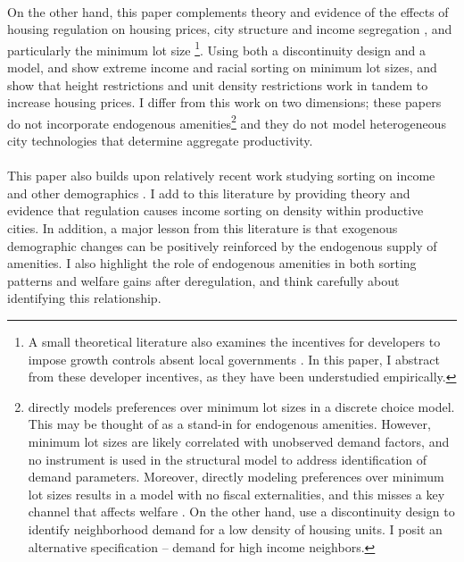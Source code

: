 \documentclass[12pt]{article}
\begin{document}
	\paragraph*{}
	On the other hand, this paper complements theory and evidence of the effects of housing regulation on housing prices, city structure and income segregation \citep{MolloyRSUE, gyourkomolloy, turner2014, glaesergyourko2018, bruecknersingh, anagoletal2021, bbheight, mills2005, HILBER2013, op2014}, and particularly the minimum lot size \citep{zabel, Song, kulka, Cui, molloynathansonpaciorek, KSC, griesonwhite, WHITE1975}\footnote{A small theoretical literature also examines the incentives for developers to impose growth controls absent local governments \citep{helseystrangeGrowthControls, HendersonThisseDevelopers}. In this paper, I abstract from these developer incentives, as they have been understudied empirically.}. Using both a discontinuity design and a model, \cite{Song} and \cite{kulka} show extreme income and racial sorting on minimum lot sizes, and \cite{KSC} show that height restrictions and unit density restrictions work in tandem to increase housing prices. I differ from this work on two dimensions; these papers do not incorporate endogenous amenities\footnote{\cite{Song} directly models preferences over minimum lot sizes in a discrete choice model. This may be thought of as a stand-in for endogenous amenities. However, minimum lot sizes are likely correlated with unobserved demand factors, and no instrument is used in the structural model to address identification of demand parameters. Moreover, directly modeling preferences over minimum lot sizes results in a model with no fiscal externalities, and this misses a key channel that affects welfare \citep{hamilton1976, calabresetal}. On the other hand, \cite{KSC} use a discontinuity design to identify neighborhood demand for a low density of housing units. I posit an alternative specification -- demand for high income neighbors.} and they do not model heterogeneous city technologies that determine aggregate productivity.
	
	\paragraph*{}
	This paper also builds upon relatively recent work studying sorting on income and other demographics \citep{diamond2016, bshartley2020, couturehandbury, Coutureetal, superstarcities, su2021, citysizewagegap, Gentrificationcycles, FogliGuerrieri, ccpoortransport, parispoor, LeeandLin}. I add to this literature by providing theory and evidence that regulation causes income sorting on density within productive cities. In addition, a major lesson from this literature is that exogenous demographic changes can be positively reinforced by the endogenous supply of amenities. I also highlight the role of endogenous amenities in both sorting patterns and welfare gains after deregulation, and think carefully about identifying this relationship.
	
\end{document}
